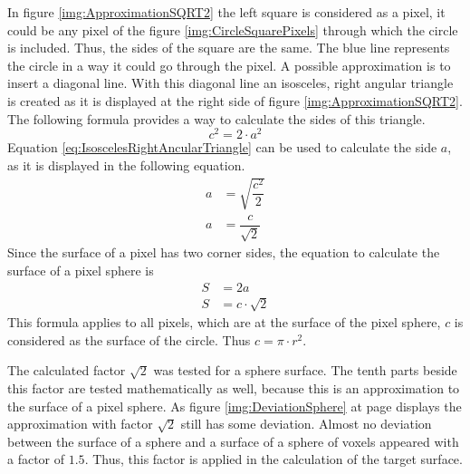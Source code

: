 In figure \ref{img:ApproximationSQRT2} the left square is considered as a pixel, it could be any pixel of the figure \ref{img:CircleSquarePixels} through which the circle is included. Thus, the sides of the square are the same. The blue line represents the circle in a way it could go through the pixel. A possible approximation is to insert a diagonal line. With this diagonal line an isosceles, right angular triangle is created as it is displayed at the right side of figure \ref{img:ApproximationSQRT2}. \newline
The following formula provides a way to calculate the sides of this triangle.
\begin{equation}\label{eq:IsoscelesRightAncularTriangle}
c^{2} = 2 \cdot a^{2}
\end{equation}
Equation \ref{eq:IsoscelesRightAncularTriangle} can be used to calculate the side $a$, as it is displayed in the following equation.
\begin{equation}\label{eq:CornerSideAOfTriangle}
\begin{split}
a &= \sqrt{\dfrac{c^{2}}{2}} \\
a &= \dfrac{c}{\sqrt{2}}
\end{split}
\end{equation}
Since the surface of a pixel has two corner sides, the equation to calculate the surface of a pixel sphere is
\begin{equation}\label{eq:PixelSurfaceCalculation}
\begin{split}
S &= 2a \\
S &= c \cdot \sqrt{2}
\end{split}
\end{equation}
This formula applies to all pixels, which are at the surface of the pixel sphere, $c$ is considered as the surface of the circle. Thus $c = \pi \cdot r^{2}$.

The calculated factor $\sqrt{2}$ was tested for a sphere surface. The tenth parts beside this factor are tested mathematically as well, because this is an approximation to the surface of a pixel sphere. As figure \ref{img:DeviationSphere} at page \pageref{img:DeviationSphere} displays the  approximation with factor $\sqrt{2}$ still has some deviation. Almost no deviation between the surface of a sphere and a surface of a sphere of voxels appeared with a factor of $1.5$. Thus, this factor is applied in the calculation of the target surface. 

